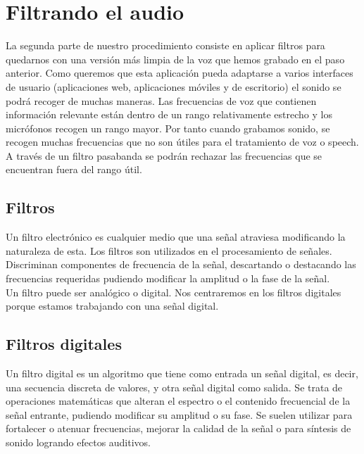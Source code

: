 
\section{Filtrando el audio}

La segunda parte de nuestro procedimiento consiste en aplicar filtros para quedarnos con una versión más limpia de la voz que hemos grabado en el paso anterior. Como queremos que esta aplicación pueda adaptarse a varios interfaces de usuario (aplicaciones web, aplicaciones móviles y de escritorio) el sonido se podrá recoger de muchas maneras. Las frecuencias de voz que contienen información relevante están dentro de un rango relativamente estrecho y los micrófonos recogen un rango mayor. Por tanto cuando grabamos sonido, se recogen muchas frecuencias que no son útiles para el tratamiento de voz o speech. A través de un filtro pasabanda se podrán rechazar las frecuencias que se encuentran fuera del rango útil.

\subsection{Filtros}
 
Un filtro electrónico es cualquier medio que una señal atraviesa modificando la naturaleza de esta. Los filtros son utilizados en el procesamiento de señales. Discriminan componentes de frecuencia de la señal, descartando o destacando las frecuencias requeridas pudiendo modificar la amplitud o la fase de la señal. \\%

Un filtro puede ser analógico o digital. Nos centraremos en los filtros digitales porque estamos trabajando con una señal digital. 

\subsection{Filtros digitales}

Un filtro digital es un algoritmo que tiene como entrada un señal digital, es decir, una secuencia discreta de valores, y otra señal digital como salida. Se trata de operaciones matemáticas que alteran el espectro o el contenido frecuencial de la señal entrante, pudiendo modificar su amplitud o su fase. Se suelen utilizar para fortalecer o atenuar frecuencias, mejorar la calidad de la señal o para síntesis de sonido logrando efectos auditivos. \\%

